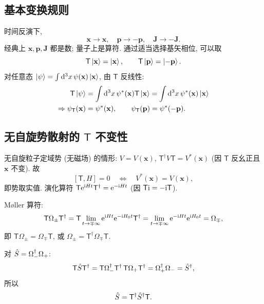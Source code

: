 \subsection{基本变换规则}

时间反演下,
\[
\mathbf{x}\to \mathbf{x},\quad \mathbf{p}\to -\mathbf{p},\quad \mathbf{J}\to -\mathbf{J}.
\]
经典上 $\mathbf{x},\mathbf{p},\mathbf{J}$ 都是数; 量子上是算符. 通过适当选择基矢相位, 可以取
\begin{equation}\label{eq:Tbasis}
\mathsf{T}\ket{\mathbf{x}}=\ket{\mathbf{x}},\qquad \mathsf{T}\ket{\mathbf{p}}=\ket{-\mathbf{p}}.
\end{equation}
对任意态 $\ket{\psi}=\int \mathrm{d}^3x\,\psi(\mathbf{x})\ket{\mathbf{x}}$, 由 $\mathsf{T}$ 反线性:
\begin{align}
\mathsf{T}\ket{\psi}&=\int \mathrm{d}^3x\,\psi^*(\mathbf{x})\mathsf{T}\ket{\mathbf{x}}=\int \mathrm{d}^3x\,\psi^*(\mathbf{x})\ket{\mathbf{x}}\nonumber\\
\Rightarrow \psi_{\mathsf{T}}(\mathbf{x})&=\psi^*(\mathbf{x}),\qquad \psi_{\mathsf{T}}(\mathbf{p})=\psi^*(-\mathbf{p}).
\end{align}

\subsection{无自旋势散射的 \texorpdfstring{$\mathsf{T}$}{T} 不变性}

无自旋粒子定域势 (无磁场) 的情形: $V=V(\mathbf{x})$, $\mathsf{T}^\dagger V \mathsf{T}=V^*(\mathbf{x})$ (因 $\mathsf{T}$ 反幺正且 $\mathbf{x}$ 不变). 故
\[
[\mathsf{T},H]=0\quad\Longleftrightarrow\quad V^*(\mathbf{x})=V(\mathbf{x}),
\]
即势取实值. 演化算符 $\mathsf{T}\mathrm{e}^{\mathrm{i} Ht}\mathsf{T}^\dagger=\mathrm{e}^{-\mathrm{i} Ht}$ (因 $\mathsf{T}\mathrm{i}=-\mathrm{i}\mathsf{T}$).

Møller 算符:
\[
\mathsf{T}\Omega_\pm \mathsf{T}^\dagger=\mathsf{T}\lim_{t\to \mp\infty}\mathrm{e}^{\mathrm{i} Ht}\mathrm{e}^{-\mathrm{i} H_0 t}\mathsf{T}^\dagger
=\lim_{t\to \mp\infty}\mathrm{e}^{-\mathrm{i} Ht}\mathrm{e}^{\mathrm{i} H_0 t}=\Omega_\mp,
\]
即 $\mathsf{T}\Omega_\pm=\Omega_\mp\mathsf{T}$, 或 $\Omega_\pm =\mathsf{T}^\dagger\Omega_\mp \mathsf{T}$.

对 $\hat{S}=\Omega_-^\dagger \Omega_+$:
\[
\mathsf{T}\hat{S} \mathsf{T}^\dagger=\mathsf{T}\Omega_-^\dagger \mathsf{T}^\dagger\,\mathsf{T}\Omega_+\mathsf{T}^\dagger=\Omega_+^\dagger \Omega_-=\hat{S}^\dagger,
\]
所以
\begin{equation}\label{eq:T-S}
\hat{S}=\mathsf{T}^\dagger \hat{S}^\dagger \mathsf{T}.
\end{equation}

